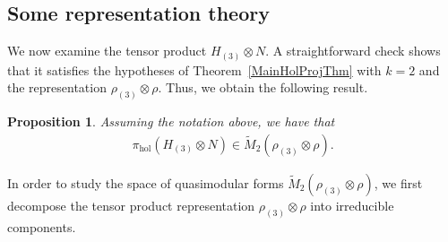 \documentclass[11pt,reqno]{amsart}
\newtheorem{prp}[theorem]{Proposition}
\renewcommand{\=}{\;=\;}
\theoremstyle{myremark}
\begin{document}
\subsection{Some representation theory}
\label{RepnTheory}

We now examine the tensor product $H_{(3)}\!\otimes N$. 
A straightforward check shows that it satisfies the hypotheses of Theorem~\ref{MainHolProjThm} with $k=2$ and the representation $\rho_{(3)}\!\otimes \rho$. 
Thus, we obtain the following result.
\begin{prp}\label{HolProjSpace}
Assuming the notation above, we have that
\begin{align*}
\pi_{\mathrm{hol}}(H_{(3)}\!\otimes N) \in \widetilde{M}_2(\rho_{(3)}\!\otimes \rho).
\end{align*}
\end{prp}

In order to study the space of quasimodular forms $\widetilde{M}_2(\rho_{(3)}\!\otimes \rho)$, we first decompose the tensor product representation $\rho_{(3)}\otimes\rho$ into irreducible components.
\end{document}
